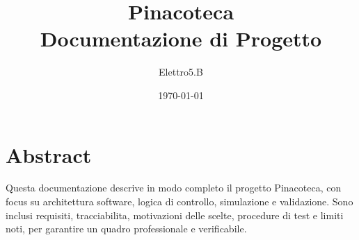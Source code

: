 \documentclass[11pt,a4paper]{report}
\title{Pinacoteca\\Documentazione di Progetto}
\author{Elettro5.B}
\date{\today}
\begin{document}
\hypersetup{pageanchor=false}
\maketitle
\thispagestyle{empty}
\chapter*{Abstract}
Questa documentazione descrive in modo completo il progetto Pinacoteca, con focus su architettura software, logica di controllo, simulazione e validazione. Sono inclusi requisiti, tracciabilita, motivazioni delle scelte, procedure di test e limiti noti, per garantire un quadro professionale e verificabile.
\tableofcontents
\clearpage
{}
\hypersetup{pageanchor=true}
























\end{document}
